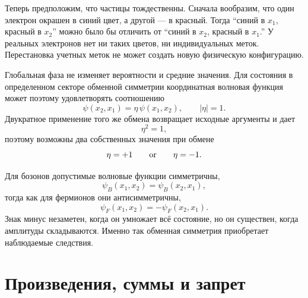 Теперь предположим, что частицы тождественны. Сначала вообразим, что один электрон окрашен в синий цвет, а другой — в красный. Тогда ``синий в \(x_1\), красный в \(x_2\)'' можно было бы отличить от ``синий в \(x_2\), красный в \(x_1\).'' У реальных электронов нет ни таких цветов, ни индивидуальных меток. Перестановка учетных меток не может создать новую физическую конфигурацию.

Глобальная фаза не изменяет вероятности и средние значения. Для состояния в определенном секторе обменной симметрии координатная волновая функция может поэтому удовлетворять соотношению
\begin{equation}
\psi(x_2,x_1)=\eta\,\psi(x_1,x_2),
\qquad
\lvert\eta\rvert=1.
\end{equation}
Двукратное применение того же обмена возвращает исходные аргументы и дает
\begin{equation}
\eta^2=1,
\end{equation}
поэтому возможны два собственных значения при обмене
\begin{equation}
\eta=+1
\qquad\hbox{or}\qquad
\eta=-1.
\end{equation}


Для бозонов допустимые волновые функции симметричны,
\begin{equation}
\psi_B(x_1,x_2)=\psi_B(x_2,x_1),
\end{equation}
тогда как для фермионов они антисимметричны,
\begin{equation}
\psi_F(x_1,x_2)=-\psi_F(x_2,x_1).
\end{equation}
Знак минус незаметен, когда он умножает всё состояние, но он существен, когда амплитуды складываются. Именно так обменная симметрия приобретает наблюдаемые следствия.

\section{Произведения, суммы и запрет}

